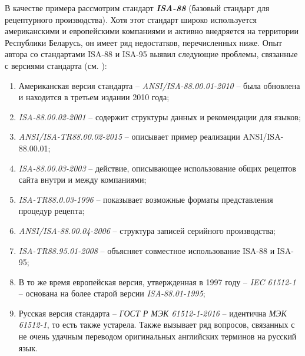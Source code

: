 В качестве примера рассмотрим стандарт \textbf{\textit{ISA-88}} \cite{ISA88} (базовый стандарт для рецептурного производства). Хотя этот стандарт широко используется американскими и европейскими компаниями и активно внедряется на территории Республики Беларусь, он имеет ряд недостатков, перечисленных ниже. Опыт автора со стандартами ISA-88 и ISA-95 выявил следующие проблемы, связанные с версиями стандарта (см. ):
\begin{enumerate}
    \item Американская версия стандарта -- \textit{ANSI/ISA-88.00.01-2010} -- была обновлена и находится в третьем издании 2010 года;
    \item \textit{ISA-88.00.02-2001} – содержит структуры данных и рекомендации для языков;
    \item \textit{ANSI/ISA-TR88.00.02-2015} -- описывает пример реализации ANSI/ISA-88.00.01;
    \item \textit{ISA-88.00.03-2003} -- действие, описывающее использование общих рецептов сайта внутри и между компаниями;
    \item \textit{ISA-TR88.0.03-1996} -- показывает возможные форматы представления процедур рецепта;
    \item \textit{ANSI/ISA-88.00.04-2006} -- структура записей серийного производства;
    \item \textit{ISA-TR88.95.01-2008} -- объясняет совместное использование ISA-88 и ISA-95;
    \item В то же время европейская версия, утвержденная в 1997 году -- \textit{IEC 61512-1} -- основана на более старой версии \textit{ISA-88.01-1995};
    \item Русская версия стандарта -- \textit{ГОСТ Р МЭК 61512-1-2016} -- идентична \textit{МЭК 61512-1}, то есть также устарела. Также вызывает ряд вопросов, связанных с не очень удачным переводом оригинальных английских терминов на русский язык.
\end{enumerate}


